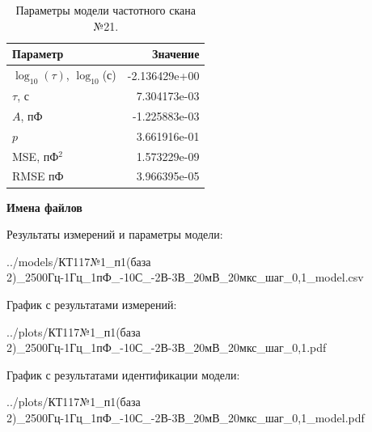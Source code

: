 \begin{table}[!ht]
    \centering
    \caption{Параметры модели частотного скана №21.}
    \begin{tabular}{|l|r|}
        \hline
        Параметр                                       & Значение                  \\ \hline
        $\log_{10}(\tau)$, $\log_{10}$(с)              & -2.136429e+00             \\ \hline
        $\tau$, с                                      & 7.304173e-03              \\ \hline
        $A$, пФ                                        & -1.225883e-03             \\ \hline
        $p$                                            & 3.661916e-01              \\ \hline
        MSE, пФ$^2$                                    & 1.573229e-09              \\ \hline
        RMSE пФ                                        & 3.966395e-05              \\ \hline
    \end{tabular}
    \label{table:frequency_scan_model_21}
\end{table}

\textbf{Имена файлов}

Результаты измерений и параметры модели:

\scriptsize../models/КТ117№1\_п1(база 2)\_2500Гц-1Гц\_1пФ\_-10С\_-2В-3В\_20мВ\_20мкс\_шаг\_0,1\_model.csv
\normalsize

График с результатами измерений:

\scriptsize../plots/КТ117№1\_п1(база 2)\_2500Гц-1Гц\_1пФ\_-10С\_-2В-3В\_20мВ\_20мкс\_шаг\_0,1.pdf
\normalsize

График с результатами идентификации модели:

\scriptsize../plots/КТ117№1\_п1(база 2)\_2500Гц-1Гц\_1пФ\_-10С\_-2В-3В\_20мВ\_20мкс\_шаг\_0,1\_model.pdf
\normalsize


